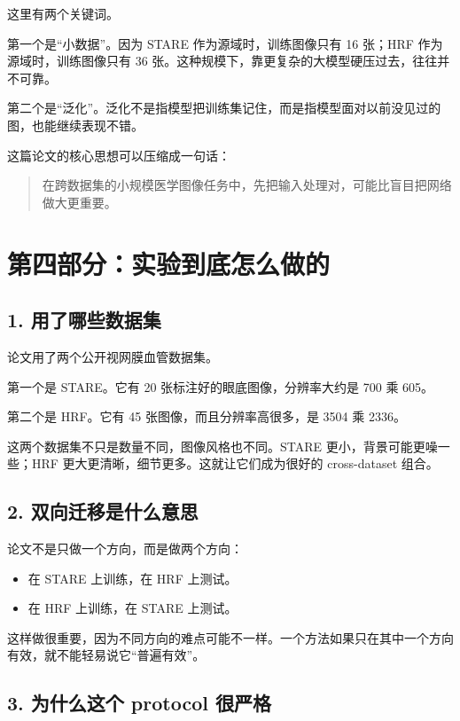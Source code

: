 \documentclass[12pt,a4paper]{ctexart}
\begin{document}
这里有两个关键词。

第一个是“小数据”。因为 STARE 作为源域时，训练图像只有 16 张；HRF 作为源域时，训练图像只有 36 张。这种规模下，靠更复杂的大模型硬压过去，往往并不可靠。

第二个是“泛化”。泛化不是指模型把训练集记住，而是指模型面对以前没见过的图，也能继续表现不错。

这篇论文的核心思想可以压缩成一句话：

\begin{quote}
在跨数据集的小规模医学图像任务中，先把输入处理对，可能比盲目把网络做大更重要。
\end{quote}

\section*{第四部分：实验到底怎么做的}

\subsection*{1. 用了哪些数据集}

论文用了两个公开视网膜血管数据集。

第一个是 STARE。它有 20 张标注好的眼底图像，分辨率大约是 700 乘 605。

第二个是 HRF。它有 45 张图像，而且分辨率高很多，是 3504 乘 2336。

这两个数据集不只是数量不同，图像风格也不同。STARE 更小，背景可能更噪一些；HRF 更大更清晰，细节更多。这就让它们成为很好的 cross-dataset 组合。

\subsection*{2. 双向迁移是什么意思}

论文不是只做一个方向，而是做两个方向：

\begin{itemize}[leftmargin=1.6em]
  \item 在 STARE 上训练，在 HRF 上测试。
  \item 在 HRF 上训练，在 STARE 上测试。
\end{itemize}

这样做很重要，因为不同方向的难点可能不一样。一个方法如果只在其中一个方向有效，就不能轻易说它“普遍有效”。

\subsection*{3. 为什么这个 protocol 很严格}
\end{document}
